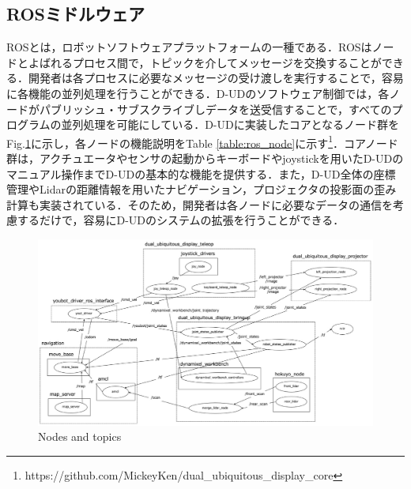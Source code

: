 \documentclass[12pt]{sonota/aislab}
\begin{document}
\subsection{ROSミドルウェア}
ROSとは，ロボットソフトウェアプラットフォームの一種である．ROSはノードとよばれるプロセス間で，トピックを介してメッセージを交換することができる．開発者は各プロセスに必要なメッセージの受け渡しを実行することで，容易に各機能の並列処理を行うことができる．D-UDのソフトウェア制御では，各ノードがパブリッシュ・サブスクライブしデータを送受信することで，すべてのプログラムの並列処理を可能にしている．D-UDに実装したコアとなるノード群をFig.\ref{rqt}に示し，各ノードの機能説明をTable \ref{table:ros_node}に示す\footnote{https://github.com/MickeyKen/dual\_ubiquitous\_display\_core}．コアノード群は，アクチュエータやセンサの起動からキーボードやjoystickを用いたD-UDのマニュアル操作までD-UDの基本的な機能を提供する．また，D-UD全体の座標管理やLidarの距離情報を用いたナビゲーション，プロジェクタの投影面の歪み計算も実装されている．そのため，開発者は各ノードに必要なデータの通信を考慮するだけで，容易にD-UDのシステムの拡張を行うことができる．


\begin{figure}[t]
\begin{center}
\includegraphics[clip, width=18cm, angle=90]{figs/dud_rqt_graph.eps}
\caption{Nodes and topics}
\label{rqt}
\end{center}
\end{figure}
\end{document}
